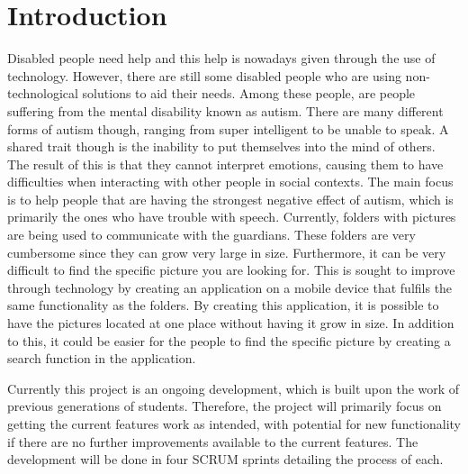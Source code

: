 \chapter{Introduction}

Disabled people need help and this help is nowadays given through the use of technology.
However, there are still some disabled people who are using non-technological solutions to aid their needs.
Among these people, are people suffering from the mental disability known as autism.
There are many different forms of autism though, ranging from super intelligent to be unable to speak.
A shared trait though is the inability to put themselves into the mind of others.
The result of this is that they cannot interpret emotions, causing them to have difficulties when interacting with other people in social contexts.
The main focus is to help people that are having the strongest negative effect of autism, which is primarily the ones who have trouble with speech.
Currently, folders with pictures are being used to communicate with the guardians.
These folders are very cumbersome since they can grow very large in size.
Furthermore, it can be very difficult to find the specific picture you are looking for.
This is sought to improve through technology by creating an application on a mobile device that fulfils the same functionality as the folders.
By creating this application, it is possible to have the pictures located at one place without having it grow in size.
In addition to this, it could be easier for the people to find the specific picture by creating a search function in the application.

Currently this project is an ongoing development, which is built upon the work of previous generations of students.
Therefore, the project will primarily focus on getting the current features work as intended, with potential for new functionality if there are no further improvements available to the current features.
The development will be done in four SCRUM sprints detailing the process of each.
